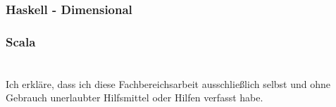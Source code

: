 \documentclass[12pt,oneside,a4paper]{scrbook}
\theoremstyle{definition}
\begin{document}
\subsection{Haskell - Dimensional}
\citep{Buckwalter06}

\subsection{Scala}
\citep{Hans12}
\citep{Nygard09}
\citep{McBeath08}

\singlespacing

{}

\chapter*{}
\onehalfspacing
Ich erkläre, dass ich diese Fachbereichsarbeit ausschließlich selbst und ohne Gebrauch unerlaubter Hilfsmittel oder Hilfen verfasst habe.
\end{document}
